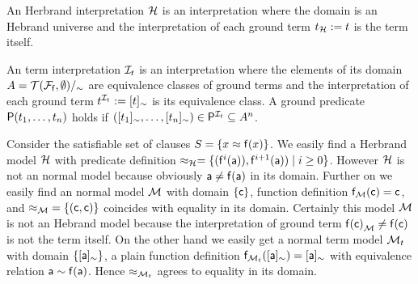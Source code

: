 \begin{definition}
	An {\myem Herbrand interpretation} ${\mathcal H}$ is an interpretation where the domain 
	is an Hebrand universe
	and the interpretation of each ground term $t_{\mathcal H} := t$ is the term itself.
\end{definition}


\begin{definition}
	An {\myem term interpretation} 
	${\mathcal I}_t$ 
	is an interpretation 
	where the elements of its domain $A = {{\mathcal T}({\mathcal F}_{\mathsf f},\emptyset)}/_\sim$ 
		are equivalence classes of ground terms
		and the interpretation of each ground term $t^{{\mathcal I}_t} := [t]_\sim$ is its equivalence class.
	 A ground predicate ${\mathsf P}(t_1,\ldots,t_n)$ holds if 
	 $([t_1]_\sim,\ldots,[t_n]_\sim) \in {\mathsf P}^{{\mathcal I}_t} \subseteq A^n$.
	
\end{definition}

\begin{example}
	Consider the satisfiable set of clauses $S = \{ x \approx {\mathsf f}(x) \}$. 
%	
	We easily find a Herbrand model ${\mathcal H}$ with
	predicate definition $\approx_{\mathcal H} = \{ ({\mathsf f}^{i}({\mathsf a})), {\mathsf f}^{i+1}({\mathsf a})) \mid i\geq 0  \} $. 
	However ${\mathcal H}$ is not an normal model because obviously ${\mathsf a}\neq{\mathsf f}({\mathsf a})$ in its domain.
%	
	Further on we easily find an normal model ${\mathcal M}$ 
	with domain $\{ {\mathsf c} \}$, function definition ${\mathsf f}_{\mathcal M}({\mathsf c}) = {\mathsf c}$, 
	and ${\approx_{\mathcal M}} = \{ ({\mathsf c},{\mathsf c})\}$ coincides with equality in its domain.
	Certainly this model ${\mathcal M}$ is not an Hebrand model 
	because the interpretation of ground term ${{\mathsf f}({\mathsf c})}_{\mathcal M} \neq {\mathsf f}({\mathsf c})$ is not the term itself.
%	
	On the other hand we easily get a normal term model ${\mathcal M}_t$ with domain $\{ [{\mathsf a}]_\sim\}$, 
	a plain function definition
	${\mathsf f}_{{\mathcal M}_t}([{\mathsf a}]_\sim) = [{\mathsf a}]_\sim$
	with equivalence relation
	${\mathsf a} \sim {\mathsf f}({\mathsf a})$.
	Hence $\approx_{{\mathcal M}_t}$ agrees to equality in its domain.	
\end{example}


